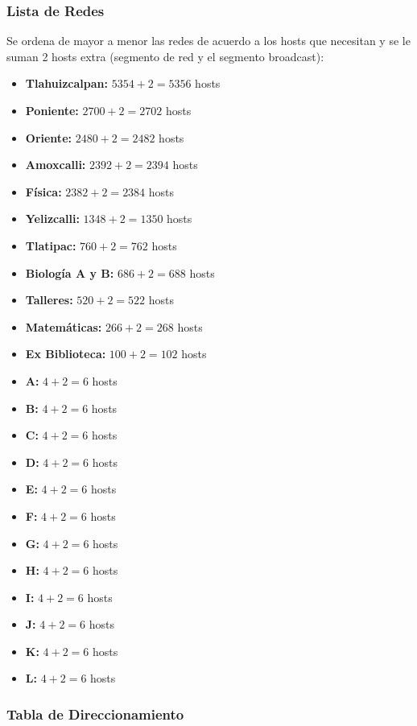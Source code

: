 \subsubsection*{Lista de Redes}
Se ordena de mayor a menor las redes de acuerdo a los hosts que necesitan y se le suman 2 hosts extra (segmento de red y el segmento broadcast):

\begin{itemize}[leftmargin=*]
    \item \textbf{Tlahuizcalpan:} $5354 + 2 = 5356$ hosts
    \item \textbf{Poniente:} $2700 + 2 = 2702$ hosts
    \item \textbf{Oriente:} $2480 + 2 = 2482$ hosts
    \item \textbf{Amoxcalli:} $2392 + 2 = 2394$ hosts
    \item \textbf{Física:} $2382 + 2 = 2384$ hosts
    \item \textbf{Yelizcalli:} $1348 + 2 = 1350$ hosts
    \item \textbf{Tlatipac:} $760 + 2 = 762$ hosts
    \item \textbf{Biología A y B:} $686 + 2 = 688$ hosts
    \item \textbf{Talleres:} $520 + 2 = 522$ hosts
    \item \textbf{Matemáticas:} $266 + 2 = 268$ hosts
    \item \textbf{Ex Biblioteca:} $100 + 2 = 102$ hosts
    \item \textbf{A:} $4 + 2 = 6$ hosts
    \item \textbf{B:} $4 + 2 = 6$ hosts
    \item \textbf{C:} $4 + 2 = 6$ hosts
    \item \textbf{D:} $4 + 2 = 6$ hosts
    \item \textbf{E:} $4 + 2 = 6$ hosts
    \item \textbf{F:} $4 + 2 = 6$ hosts
    \item \textbf{G:} $4 + 2 = 6$ hosts
    \item \textbf{H:} $4 + 2 = 6$ hosts
    \item \textbf{I:} $4 + 2 = 6$ hosts
    \item \textbf{J:} $4 + 2 = 6$ hosts
    \item \textbf{K:} $4 + 2 = 6$ hosts
    \item \textbf{L:} $4 + 2 = 6$ hosts
\end{itemize}

\subsubsection*{Tabla de Direccionamiento}

